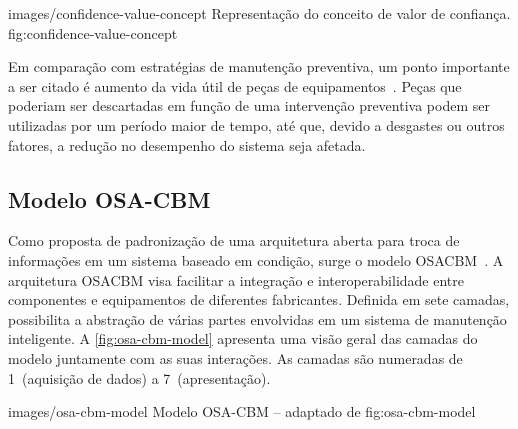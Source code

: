     {images/confidence-value-concept}
    {Representação do conceito de valor de confiança.}
    {fig:confidence-value-concept}



Em comparação com estratégias de manutenção preventiva, um ponto importante a ser citado é aumento
da vida útil de peças de equipamentos~\cite{lazzaretti2012avaliacao}. Peças que poderiam ser
descartadas em função de uma intervenção preventiva podem ser utilizadas por um período maior de
tempo, até que, devido a desgastes ou outros fatores, a redução no desempenho do sistema seja
afetada.


\subsection{Modelo OSA-CBM}

Como proposta de padronização de uma arquitetura aberta para troca de informações em um sistema
baseado em condição, surge o modelo \gls{OSACBM}~\cite{thurston2001open}. A arquitetura \gls{OSACBM}
visa facilitar a integração e interoperabilidade entre componentes e equipamentos de diferentes
fabricantes. Definida em sete camadas, possibilita a abstração de várias partes envolvidas em um
sistema de manutenção inteligente. A \cref{fig:osa-cbm-model} apresenta uma visão geral das camadas
do modelo juntamente com as suas interações. As camadas são numeradas de 1~(aquisição de dados) a
7~(apresentação).

    {images/osa-cbm-model}
    {Modelo OSA-CBM -- adaptado de \cite{mimosa2014homepage}}
    {fig:osa-cbm-model}

